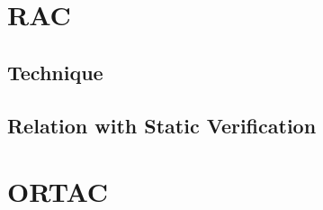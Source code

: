 \section{RAC}
\label{sec:rac}

\subsection{Technique}
\label{sub:technique}

\subsection{Relation with Static Verification}
\label{sub:relation_with_static_verification}

\section{ORTAC}
\label{sec:ortac}